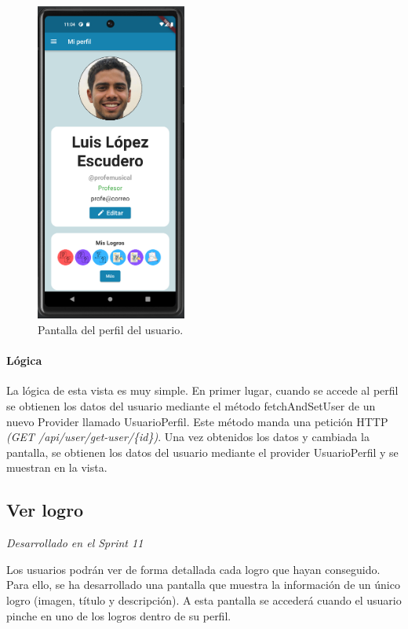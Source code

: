 \begin{figure}[H]
  \centering
  \includegraphics[width=0.44\textwidth]{imagenes/c7/miperfil.png}
  \caption{Pantalla del perfil del usuario.}
  \label{fig:login}
\end{figure}


\paragraph*{Lógica}
\label{sec:logica}
La lógica de esta vista es muy simple. En primer lugar, cuando se accede al perfil se obtienen los datos del usuario mediante el método fetchAndSetUser de un nuevo Provider llamado UsuarioPerfil. Este método
manda una petición HTTP \textit{(GET /api/user/get-user/\{id\})}. Una vez obtenidos los datos y cambiada la pantalla, se obtienen los datos del usuario mediante el provider UsuarioPerfil y se muestran en la vista. 


\subsection{Ver logro} 

\textit{Desarrollado en el Sprint 11}

Los usuarios podrán ver de forma detallada cada logro que hayan conseguido. Para ello, se ha desarrollado una pantalla que muestra la información de un único logro (imagen, título y descripción). A esta pantalla se accederá
cuando el usuario pinche en uno de los logros dentro de su perfil.
